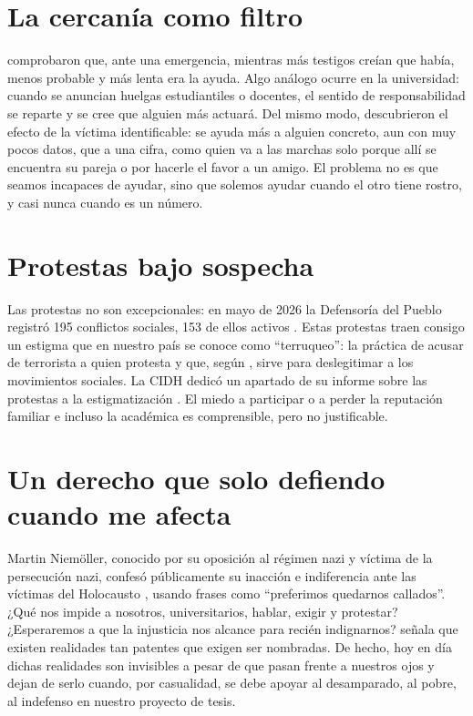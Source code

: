 \documentclass[10pt,a4paper]{article}
\begin{document}
\section*{La cercanía como filtro}
\textcite{darley1968} comprobaron que, ante una emergencia, mientras más testigos creían que había, menos probable y más lenta era la ayuda. Algo análogo ocurre en la universidad: cuando se anuncian huelgas estudiantiles o docentes, el sentido de responsabilidad se reparte y se cree que alguien más actuará. Del mismo modo, \textcite{small2003} descubrieron el efecto de la víctima identificable: se ayuda más a alguien concreto, aun con muy pocos datos, que a una cifra, como quien va a las marchas solo porque allí se encuentra su pareja o por hacerle el favor a un amigo. El problema no es que seamos incapaces de ayudar, sino que solemos ayudar cuando el otro tiene rostro, y casi nunca cuando es un número.

\section*{Protestas bajo sospecha}
Las protestas no son excepcionales: en mayo de 2026 la Defensoría del Pueblo registró 195 conflictos sociales, 153 de ellos activos \parencite{defensoria2026}. Estas protestas traen consigo un estigma que en nuestro país se conoce como \enquote{terruqueo}: la práctica de acusar de terrorista a quien protesta y que, según \textcite{VelasquezVillalba2022}, sirve para deslegitimar a los movimientos sociales. La CIDH dedicó un apartado de su informe sobre las protestas a la estigmatización \parencite{cidh2023}. El miedo a participar o a perder la reputación familiar e incluso la académica es comprensible, pero no justificable.

\section*{Un derecho que solo defiendo cuando me afecta}
Martin Niemöller, conocido por su oposición al régimen nazi y víctima de la persecución nazi, confesó públicamente su inacción e indiferencia ante las víctimas del Holocausto \parencite{niemoeller_ushmm}, usando frases como \enquote{preferimos quedarnos callados}. ¿Qué nos impide a nosotros, universitarios, hablar, exigir y protestar? ¿Esperaremos a que la injusticia nos alcance para recién indignarnos? \textcite{cortina2017} señala que existen realidades tan patentes que exigen ser nombradas. De hecho, hoy en día dichas realidades son invisibles a pesar de que pasan frente a nuestros ojos y dejan de serlo cuando, por casualidad, se debe apoyar al desamparado, al pobre, al indefenso en nuestro proyecto de tesis.
\end{document}
